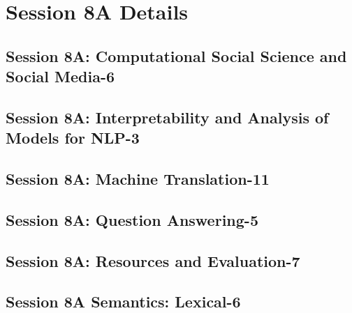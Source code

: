 \section{Session 8A Details}
\subsection{\large Session 8A: Computational Social Science and Social Media-6}
\label{parallel-session-8A-trackA}
\TrackALoc\hfill\sessionchair{}{}
\clearpage
\subsection{\large Session 8A: Interpretability and Analysis of Models for NLP-3}
\label{parallel-session-8A-trackB}
\TrackBLoc\hfill\sessionchair{}{}
\clearpage
\subsection{\large Session 8A: Machine Translation-11}
\label{parallel-session-8A-trackC}
\TrackCLoc\hfill\sessionchair{}{}
\clearpage
\subsection{\large Session 8A: Question Answering-5}
\label{parallel-session-8A-trackD}
\TrackDLoc\hfill\sessionchair{}{}
\clearpage
\subsection{\large Session 8A: Resources and Evaluation-7}
\label{parallel-session-8A-trackE}
\TrackELoc\hfill\sessionchair{}{}
\clearpage
\subsection{\large Session 8A Semantics: Lexical-6}
\label{parallel-session-8A-trackF}
\TrackFLoc\hfill\sessionchair{}{}
\clearpage
